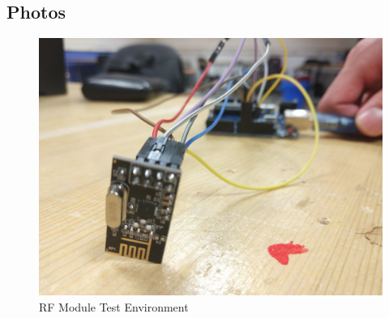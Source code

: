 \documentclass[a4paper,12pt]{article}
\begin{document}
\begin{appendices}

\section{Photos}

	\begin{figure}[H]
		\centering
		\setlength{\unitlength}{\textwidth} 
		\includegraphics[width=\textwidth,]{rf1}
		\caption{\label{fig:rf1} RF Module Test Environment}
	\end{figure}



\end{appendices}
\end{document}
